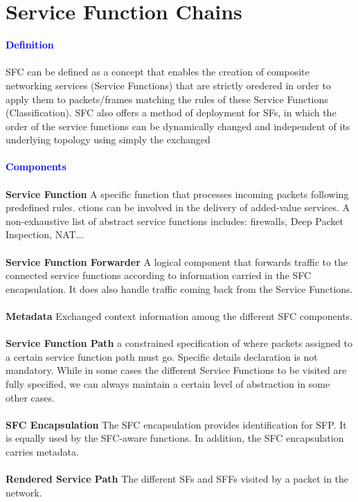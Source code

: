\section{Service Function Chains}
\textbf{\textcolor{blue}{\Large Definition}}\\
\\
SFC can be defined as a concept that enables the creation of composite
networking services (Service Functions) that are strictly oredered in order to
apply them to packets/frames matching the rules of these Service Functions
(Classification). SFC also offers a method of deployment for SFs, in which the
order of the service functions can be dynamically changed and independent of its
underlying topology using simply the exchanged\\
\\
\textbf{\textcolor{blue}{\Large Components}}\\
\\
\textbf{Service Function} A specific function that processes incoming packets following predefined rules. ctions can be involved in the delivery of added-value services. A non-exhaustive list of abstract service functions includes: firewalls, Deep Packet Inspection, NAT...\\
\\
\textbf{Service Function Forwarder} A logical component that forwards traffic to the connected
service functions according to information carried in the SFC
encapsulation. It does also handle traffic coming back from the
Service Functions.\\ 
\\
\textbf{Metadata} Exchanged context information among the different SFC components.\\
\\
\textbf{Service Function Path} a
constrained specification of where packets assigned to a certain
service function path must go. Specific details declaration is not mandatory. While in some cases the different Service Functions to be visited are fully specified, we can always maintain a certain level of abstraction in some other cases.\\
\\
\textbf{SFC Encapsulation} The SFC encapsulation  provides identification for SFP. It is equally  used by the SFC-aware functions. In addition, the SFC encapsulation carries metadata.\\
\\
\textbf{Rendered Service Path}  The different SFs and SFFs visited by a packet in the network.\\
